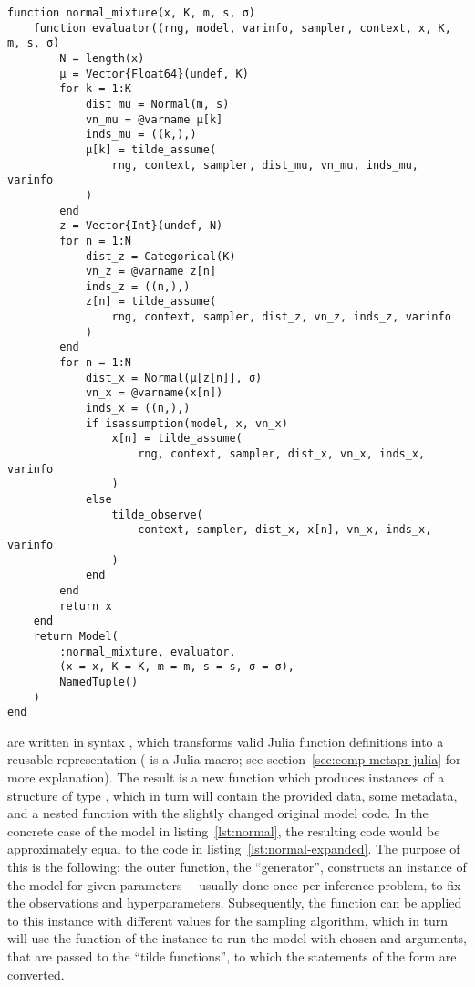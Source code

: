 \begin{lstlisting}[float=p, caption={Expansion of model~\ref{lst:normal}.}, label={lst:normal-expanded}]
function normal_mixture(x, K, m, s, σ)
    function evaluator((rng, model, varinfo, sampler, context, x, K, m, s, σ)
        N = length(x)
        μ = Vector{Float64}(undef, K)
        for k = 1:K
            dist_mu = Normal(m, s)
            vn_mu = @varname μ[k]
            inds_mu = ((k,),)
            μ[k] = tilde_assume(
                rng, context, sampler, dist_mu, vn_mu, inds_mu, varinfo
            )
        end
        z = Vector{Int}(undef, N)
        for n = 1:N
            dist_z = Categorical(K)
            vn_z = @varname z[n]
            inds_z = ((n,),)
            z[n] = tilde_assume(
                rng, context, sampler, dist_z, vn_z, inds_z, varinfo
            )
        end
        for n = 1:N
            dist_x = Normal(μ[z[n]], σ)
            vn_x = @varname(x[n])
            inds_x = ((n,),)
            if isassumption(model, x, vn_x)
                x[n] = tilde_assume(
                    rng, context, sampler, dist_x, vn_x, inds_x, varinfo
                )
            else
                tilde_observe(
                    context, sampler, dist_x, x[n], vn_x, inds_x, varinfo
                )
            end
        end
        return x
    end
    return Model(
        :normal_mixture, evaluator, 
        (x = x, K = K, m = m, s = s, σ = σ), 
        NamedTuple()
    )
end
\end{lstlisting}

 are written in \dppljl{} syntax \parencite{tarek2020dynamicppl},
which transforms valid Julia function definitions into a reusable representation ( is
a Julia macro; see section~\ref{sec:comp-metapr-julia} for more explanation).  The result is a new
function which produces instances of a structure of type , which in turn will contain
the provided data, some metadata, and a nested function with the slightly changed original model
code. In the concrete case of the model in listing~\ref{lst:normal}, the resulting code would be
approximately equal to the code in listing~\ref{lst:normal-expanded}.  The purpose of this is the
following: the outer function, the \enquote{generator}, constructs an instance of the model for
given parameters~-- usually done once per inference problem, to fix the observations and
hyperparameters.  Subsequently, the  function can be applied to this instance with
different values for the sampling algorithm, which in turn will use the  function
of the instance to run the model with chosen  and  arguments, that are
passed to the \enquote{tilde functions}, to which the statements of the form  are
converted.

